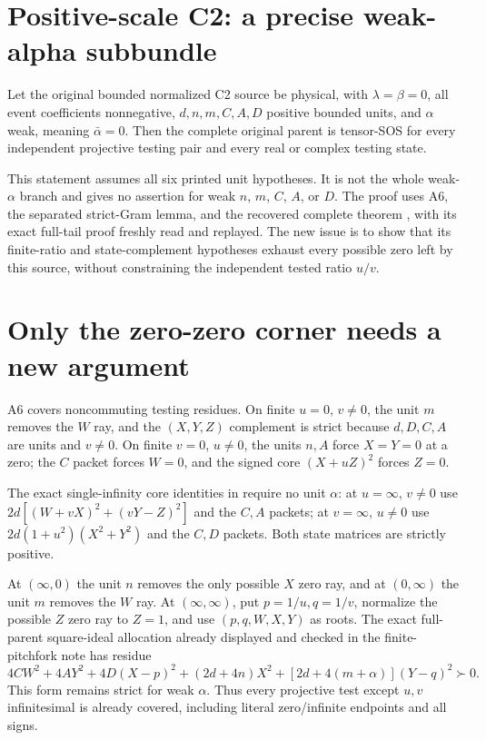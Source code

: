 \section{Positive-scale C2: a precise weak-alpha subbundle}


\begin{theorem}
Let the original bounded normalized C2 source be physical, with
$\lambda=\beta=0$, all event coefficients nonnegative,
$d,n,m,C,A,D$ positive bounded units, and $\alpha$ weak, meaning
$\bar\alpha=0$. Then the complete original parent is tensor-SOS
for every independent projective testing pair and every real or
complex testing state.
\end{theorem}

This statement assumes all six printed unit hypotheses. It is not
the whole weak-$\alpha$ branch and gives no assertion for weak $n$,
$m$, $C$, $A$, or $D$. The proof uses A6, the separated strict-Gram
lemma, and the recovered complete theorem
, with its exact
full-tail proof freshly read and replayed. The new issue is to show
that its finite-ratio and state-complement hypotheses exhaust every
possible zero left by this source, without constraining the independent
tested ratio $u/v$.

\section{Only the zero-zero corner needs a new argument}

A6 covers noncommuting testing residues. On finite $u=0$, $v\ne0$,
the unit $m$ removes the $W$ ray, and the $(X,Y,Z)$ complement is
strict because $d,D,C,A$ are units and $v\ne0$. On finite $v=0$,
$u\ne0$, the units $n,A$ force $X=Y=0$ at a zero; the $C$ packet
forces $W=0$, and the signed core $(X+uZ)^2$ forces $Z=0$.

The exact single-infinity core identities in
 require no unit $\alpha$: at
$u=\infty$, $v\ne0$ use
$2d[(W+vX)^2+(vY-Z)^2]$ and the $C,A$ packets; at $v=\infty$,
$u\ne0$ use $2d(1+u^2)(X^2+Y^2)$ and the $C,D$ packets.
Both state matrices are strictly positive.

At $(\infty,0)$ the unit $n$ removes the only possible $X$ zero
ray, and at $(0,\infty)$ the unit $m$ removes the $W$ ray.
At $(\infty,\infty)$, put $p=1/u,q=1/v$, normalize the possible
$Z$ zero ray to $Z=1$, and use $(p,q,W,X,Y)$ as roots. The exact
full-parent square-ideal allocation already displayed and checked in
the finite-pitchfork note has residue
\[
 4CW^2+4AY^2+4D(X-p)^2+(2d+4n)X^2
                         +[2d+4(m+\alpha)](Y-q)^2\succ0.
\]
This form remains strict for weak $\alpha$. Thus every projective
test except $u,v$ infinitesimal is already covered, including literal
zero/infinite endpoints and all signs.

